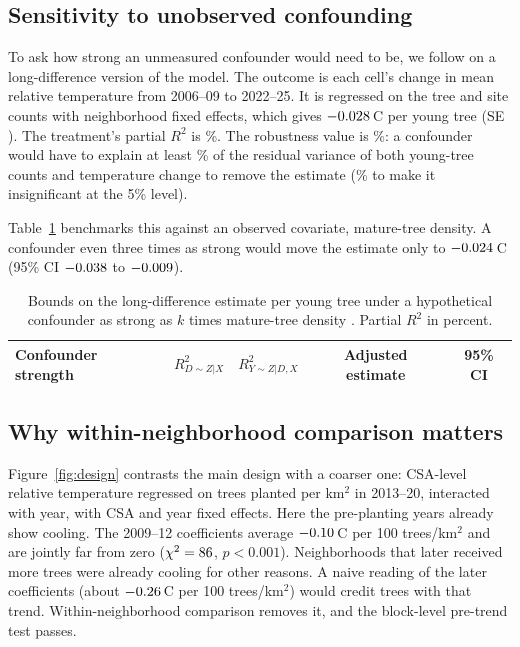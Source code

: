 \documentclass[11pt]{article}
\newcommand{\degC}{\,\textdegree C}
\begin{document}
\subsection{Sensitivity to unobserved confounding}

To ask how strong an unmeasured confounder would need to be, we follow \citet{cinelli2020} on a long-difference version of the model. The outcome is each cell's change in mean relative temperature from 2006--09 to 2022--25. It is regressed on the tree and site counts with neighborhood fixed effects, which gives $-0.028$\degC{} per young tree (SE \SeLD). The treatment's partial $R^2$ is \PartialRtwo\%. The robustness value is \RV\%: a confounder would have to explain at least \RV\% of the residual variance of both young-tree counts and temperature change to remove the estimate (\RValpha\% to make it insignificant at the 5\% level).

Table~\ref{tab:sens} benchmarks this against an observed covariate, mature-tree density. A confounder even three times as strong would move the estimate only to $-0.024$\degC{} (95\% CI $-0.038$ to $-0.009$).

\begin{table}[t]\centering\small
\caption{Bounds on the long-difference estimate per young tree under a hypothetical confounder as strong as $k$ times mature-tree density \citep{cinelli2020}. Partial $R^2$ in percent.}\label{tab:sens}
\begin{tabular}{@{}lcccc@{}}\toprule
Confounder strength & $R^2_{D\sim Z|X}$ & $R^2_{Y\sim Z|D,X}$ & Adjusted estimate & 95\% CI \\\midrule

\bottomrule\end{tabular}
\end{table}

\subsection{Why within-neighborhood comparison matters}

Figure~\ref{fig:design} contrasts the main design with a coarser one: CSA-level relative temperature regressed on trees planted per km$^2$ in 2013--20, interacted with year, with CSA and year fixed effects. Here the pre-planting years already show cooling. The 2009--12 coefficients average $-0.10$\degC{} per 100 trees/km$^2$ and are jointly far from zero ($\chi^2=86$, $p<0.001$). Neighborhoods that later received more trees were already cooling for other reasons. A naive reading of the later coefficients (about $-0.26$\degC{} per 100 trees/km$^2$) would credit trees with that trend. Within-neighborhood comparison removes it, and the block-level pre-trend test passes.
\end{document}

